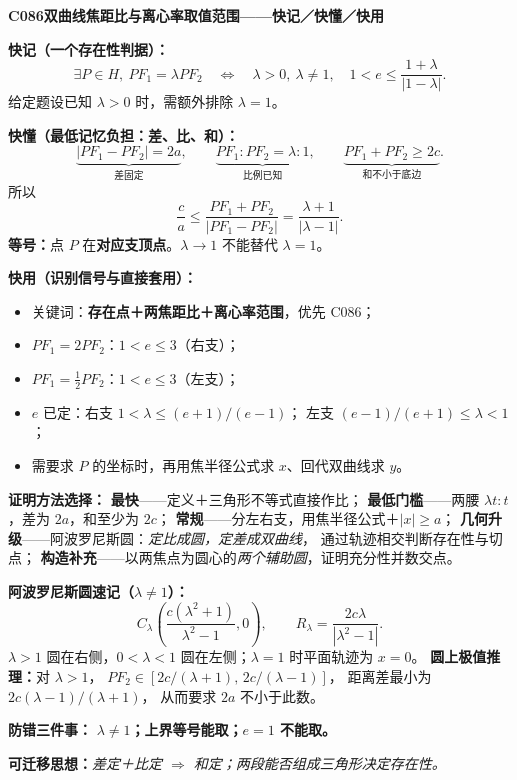 \clearpage
\begin{summarybox}
\textbf{C086\quad 双曲线焦距比与离心率取值范围——快记／快懂／快用}

\textbf{快记（一个存在性判据）：}
\[
\boxed{\exists P\in H,\ PF_1=\lambda PF_2}
\quad\Longleftrightarrow\quad
\boxed{\lambda>0,\ \lambda\ne1,\quad
1<e\le\frac{1+\lambda}{|1-\lambda|}}.
\]
给定题设已知 $\lambda>0$ 时，需额外排除 $\lambda=1$。

\textbf{快懂（最低记忆负担：差、比、和）：}
\[
\underbrace{|PF_1-PF_2|=2a}_{\text{差固定}},\qquad
\underbrace{PF_1:PF_2=\lambda:1}_{\text{比例已知}},\qquad
\underbrace{PF_1+PF_2\ge2c}_{\text{和不小于底边}}.
\]
所以
\[
\frac ca\le\frac{PF_1+PF_2}{|PF_1-PF_2|}
=\frac{\lambda+1}{|\lambda-1|}.
\]
\textbf{等号：}点 $P$ 在\textbf{对应支顶点}。$\lambda\to1$ 不能替代 $\lambda=1$。

\textbf{快用（识别信号与直接套用）：}
\begin{itemize}
\item 关键词：\textbf{存在点＋两焦距比＋离心率范围}，优先 C086；
\item $PF_1=2PF_2$：$1<e\le3$（右支）；
\item $PF_1=\frac12PF_2$：$1<e\le3$（左支）；
\item $e$ 已定：右支 $1<\lambda\le(e+1)/(e-1)$；
左支 $(e-1)/(e+1)\le\lambda<1$；
\item 需要求 $P$ 的坐标时，再用焦半径公式求 $x$、回代双曲线求 $y$。
\end{itemize}

\textbf{证明方法选择：}
\textbf{最快}——定义＋三角形不等式直接作比；
\textbf{最低门槛}——两腰 $\lambda t:t$，差为 $2a$，和至少为 $2c$；
\textbf{常规}——分左右支，用焦半径公式＋$|x|\ge a$；
\textbf{几何升级}——阿波罗尼斯圆：\emph{定比成圆，定差成双曲线}，
通过轨迹相交判断存在性与切点；
\textbf{构造补充}——以两焦点为圆心的\emph{两个辅助圆}，证明充分性并数交点。

\textbf{阿波罗尼斯圆速记（$\lambda\ne1$）：}
\[
\boxed{C_\lambda\left(\frac{c(\lambda^2+1)}{\lambda^2-1},0\right),\qquad
R_\lambda=\frac{2c\lambda}{|\lambda^2-1|}}.
\]
$\lambda>1$ 圆在右侧，$0<\lambda<1$ 圆在左侧；$\lambda=1$ 时平面轨迹为 $x=0$。
\textbf{圆上极值推理：}对 $\lambda>1$，
$PF_2\in[2c/(\lambda+1),\,2c/(\lambda-1)]$，
距离差最小为 $2c(\lambda-1)/(\lambda+1)$，
从而要求 $2a$ 不小于此数。

\textbf{防错三件事：}\textbf{ $\lambda\ne1$；上界等号能取；$e=1$ 不能取。}

\textbf{可迁移思想：}\emph{差定＋比定 $\Rightarrow$ 和定；两段能否组成三角形决定存在性。}
\end{summarybox}
